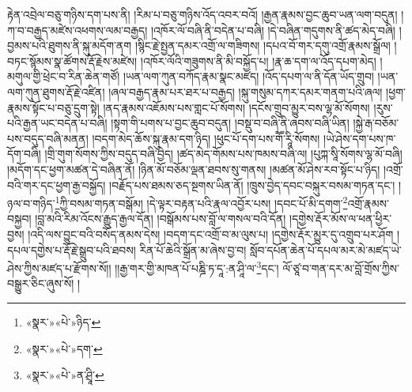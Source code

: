 རྟེན་འབྲེལ་བཅུ་གཉིས་དག་པས་ནི། །རིམ་པ་བཅུ་གཉིས་འོད་འབར་བའོ། །རྒྱན་རྣམས་བྱང་ཆུབ་ཡན་ལག་བདུན། །ཀ་བ་བརྒྱད་མཛེས་འཕགས་ལམ་བརྒྱད། །འཁོར་ལོ་བཞི་ནི་བདེན་པ་བཞི། །དེ་བཞིན་གདུགས་ནི་ཚད་མེད་བཞི། །བྱམས་པའི་ཐུགས་ནི་སྐུ་མདོག་ནག །སྙིང་རྗེ་སྤྱན་དམར་འགྲོ་ལ་གཟིགས། །དཔའ་བོ་གར་དགུ་འགྲོ་རྣམས་སྒྲོལ། །བཏང་སྙོམས་སྣ་ཚོགས་རྡོ་རྗེས་མཛེས། །འཁོར་ལོའི་གཟུགས་ནི་མི་བསྐྱོད་པ། །རྣ་ཆ་དག་ལ་འོད་དཔག་མེད། །མགུལ་གྱི་ཕྲེང་བ་རིན་ཆེན་གཙོ། །ཡན་ལག་ཀུན་བཀོད་རྣམ་སྣང་མཛད། །འོད་དཔག་ལ་ནི་དོན་ཡོད་གྲུབ། །ཡན་ལག་ཀུན་ཐུགས་རྡོ་རྗེ་འཛིན། །ཞལ་བརྒྱད་རྣམ་པར་ཐར་པ་བརྒྱད། །སྐུ་གསུམ་དཀར་དམར་གནག་པའི་ཞལ། །ཕྱག་རྣམས་སྟོང་པ་བཅུ་དྲུག་སྟེ། །ནད་རྣམས་འཇོམས་པས་གླང་པོ་སོགས། །དངོས་གྲུབ་མྱུར་བས་ལྷ་མོ་སོགས། །རུས་པའི་རྒྱན་ཡང་བདེན་པ་བཞི། །སྟག་གི་པགས་པ་བྱང་ཆུབ་བདུན། །བསྡུ་བ་བཞི་ནི་ཞབས་བཞི་ཡིན། །སྐྱེ་རྒ་བཅོམ་པས་བདུད་བཞི་མནན། །བདག་མེད་ཆོས་སྐུ་རྣམ་དག་ཉིད། །ཕུང་པོ་དག་པས་གཽ་རཱི་སོགས། །ཡེ་ཤེས་དག་པས་ཁ་དོག་བཞི། །གྲི་གུག་སོགས་ཀྱིས་བདུད་བཞི་བྱེད། །ཚད་མེད་གོམས་པས་ཁམས་བཞི་ལ། །པུཀྐ་སཱི་སོགས་ལྷ་མོ་བཞི། །མདོག་དང་ཕྱག་མཚན་དེ་བཞིན་ནོ། །ཉིན་མོ་བཅོམ་ལྡན་ཐབས་སུ་གནས། །མཚན་མོ་ཤེས་རབ་སྟོང་པ་ཉིད། །འགྲོ་བའི་གར་དང་ཕྱག་རྒྱ་བསྐྱོད། །བརྗོད་པས་ཐམས་ཅད་སྔགས་ཡིན་ནོ། །ཁྲུས་བྱེད་དབང་བསྐུར་བསམ་གཏན་དང་། །ཉལ་བ་གཉིད་\footnote{«སྣར་»«པེ་»ཉིད་}ཀྱི་བསམ་གཏན་བསྒོམ། །དེ་ལྟར་བརྟན་པའི་རྣལ་འབྱོར་པས། །དབང་པོ་མི་དགག་\footnote{«སྣར་»«པེ་»དག་}འགྲོ་རྣམས་བསྐྱབ། །བླ་མའི་རིམ་འོངས་རྒྱུད་རྒྱལ་དོན། །བསྒོམས་པས་བློ་ལ་གསལ་བའི་དོན། །དགྱེས་རྡོར་མོས་ལ་ཕན་ཕྱིར་བྱས། །འདི་ལས་བྱུང་བའི་བསོད་ནམས་དེས། །བདག་དང་འགྲོ་བ་མ་ལུས་པ། །དགྱེས་རྡོར་མྱུར་དུ་འགྲུབ་པར་ཤོག །དཔལ་དགྱེས་པ་རྡོ་རྗེ་སྒྲུབ་པའི་ཐབས། རིན་པོ་ཆེའི་སྒྲོན་མ་ཞེས་བྱ་བ། སློབ་དཔོན་ཆེན་པོ་དཔལ་མར་མེ་མཛད་ཡེ་ཤེས་ཀྱིས་མཛད་པ་རྫོགས་སོ།། །།རྒྱ་གར་གྱི་མཁན་པོ་པཎྜི་ཏ་དཱ་:ན་ཤཱི་ལ་\footnote{«སྣར་»«པེ་»ན་ཤྲཱི་}དང་། ལོ་ཙཱ་བ་གན་དར་མ་བློ་གྲོས་ཀྱིས་བསྒྱུར་ཅིང་ཞུས་སོ། ། 